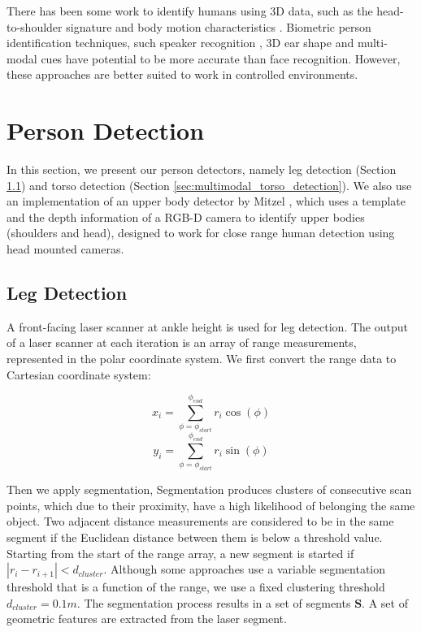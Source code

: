 \documentclass[12pt]{gatech-thesis}
\begin{document}
There has been some work to identify humans using 3D data, such as the head-to-shoulder signature \cite{kirchner2012head} and body motion characteristics \cite{munsell2012person}. Biometric person identification techniques, such speaker recognition \cite{kinnunen2010overview}, 3D ear shape \cite{yan2007biometric} and multi-modal cues \cite{garcia2003biomet} have potential to be more accurate than face recognition. However, these approaches are better suited to work in controlled environments.

\section{Person Detection}
\label{sec:multimodal_person_detection}

In this section, we present our person detectors, namely leg detection (Section \ref{sec:multimodal_leg_detection}) and torso detection (Section \ref{sec:multimodal_torso_detection}). We also use an implementation of an upper body detector by Mitzel \cite{mitzel2012close}, which uses a template and the depth information of a RGB-D camera to identify upper bodies (shoulders and head), designed to work for close range human detection using head mounted cameras.

\subsection{Leg Detection}
\label{sec:multimodal_leg_detection}

A front-facing laser scanner at ankle height is used for leg detection. The output of a laser scanner at each iteration is an array of range measurements, represented in the polar coordinate system. We first convert the range data to Cartesian coordinate system:

\[
x_{i} = \sum_{\phi = \phi_{start}}^{\phi_{end}} r_i\cos(\phi)
\]
\[
y_{i} = \sum_{\phi = \phi_{start}}^{\phi_{end}} r_i\sin(\phi)
\]

Then we apply segmentation, Segmentation produces clusters of consecutive scan points, which due to their proximity, have a high likelihood of belonging the same object. Two adjacent distance measurements are considered to be in the same segment if the Euclidean distance between them is below a threshold value. Starting from the start of the range array, a new segment is started if $|r_{i}-r_{i+1}|<d_{cluster}$. Although some approaches use a variable segmentation threshold that is a function of the range, we use a fixed clustering threshold $d_{cluster}=0.1m$. The segmentation process results in a set of segments $\mathbf{S}$. A set of geometric features are extracted from the laser segment.
\end{document}
